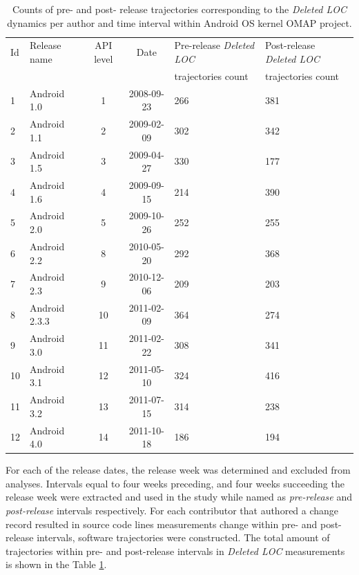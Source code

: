 \begin{table}[t]
\caption{Counts of pre- and post- release trajectories corresponding to the \textit{Deleted LOC} dynamics per author and time interval within Android OS kernel OMAP project.}
\label{android_table1}
\centering
\begin{small}
\begin{tabularx}{\linewidth}{l l c c X X}
\toprule
Id &Release name & API level & Date & Pre-release \textit{Deleted LOC} & Post-release \textit{Deleted LOC}\\
& & & & trajectories count & trajectories count\\
\midrule
1 & Android 1.0    & 1 & 2008-09-23    &  266 &    381\\
2 & Android 1.1    & 2 & 2009-02-09     & 302 &    342\\
3 & Android 1.5     & 3 & 2009-04-27    & 330  &   177\\
4 & Android 1.6     & 4 & 2009-09-15    & 214  &   390\\
5 & Android 2.0     & 5 & 2009-10-26    & 252  &   255\\
6 & Android 2.2     & 8 & 2010-05-20    &  292  &   368\\
7 & Android 2.3     & 9  & 2010-12-06    &  209   &  203\\
8 & Android 2.3.3   & 10 & 2011-02-09  &   364  &   274\\
9 & Android 3.0     & 11 & 2011-02-22    &  308   &  341\\
10 & Android 3.1     & 12 & 2011-05-10    &  324 &    416\\
11 & Android 3.2     & 13 & 2011-07-15   &   314 &    238\\
12 & Android 4.0     & 14 & 2011-10-18    &  186  &   194\\
\bottomrule
\end{tabularx}
\end{small}
\end{table}

For each of the release dates, the release week was determined and excluded from analyses. Intervals equal to four weeks preceding, and four weeks succeeding the release week were extracted and used in the study while named as \textit{pre-release} and \textit{post-release} intervals respectively. For each contributor that authored a change record resulted in source code lines measurements change within pre- and post- release intervals, software trajectories were constructed. The total amount of trajectories within pre- and post-release intervals in \textit{Deleted LOC} measurements is shown in the Table \ref{android_table1}. 

